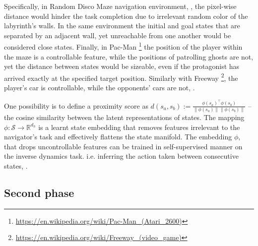 \documentclass[acmsmall, nonacm]{acmart}
\begin{document}
Specifically, in Random Disco Maze navigation environment, \citep{badia_never_2020}, the pixel-wise distance would hinder the task completion due to irrelevant random color of the labyrinth's walls. In the same environment the initial and goal states that are separated by an adjacent wall, yet unreachable from one another would be considered close states. Finally, in Pac-Man%
\footnote{
    \url{https://en.wikipedia.org/wiki/Pac-Man_(Atari_2600)}
}
the position of the player within the maze is a controllable feature, while the positions of patrolling ghosts are not, yet the distance between states would be sizeable, even if the protagonist has arrived exactly at the specified target position.
%
Similarly with Freeway%
\footnote{
    \url{https://en.wikipedia.org/wiki/Freeway_(video_game)}
}, the player's car is controllable, while the opponents' cars are not, \citep[fig.~1]{choi_contingency-aware_2019}.


One possibility is to define a proximity score as $
    d(s_a, s_b) 
        := \frac{\phi(s_a)^\top \phi(s_b)}{\|\phi(s_a)\|\|\phi(s_b)\|}
$ -- the cosine similarity between the latent representations of states. The mapping $
    \phi \colon \mathcal{S} \to \mathbb{R}^{d_h}
$ is a learnt state embedding that removes features irrelevant to the navigator's task and effectively flattens the state manifold. The embedding $\phi$, that drops uncontrollable features can be trained in self-supervised manner on the inverse dynamics task. i.e. inferring the action taken between consecutive states, \citep{choi_contingency-aware_2019,badia_never_2020}.


\subsection{Second phase}
\end{document}
